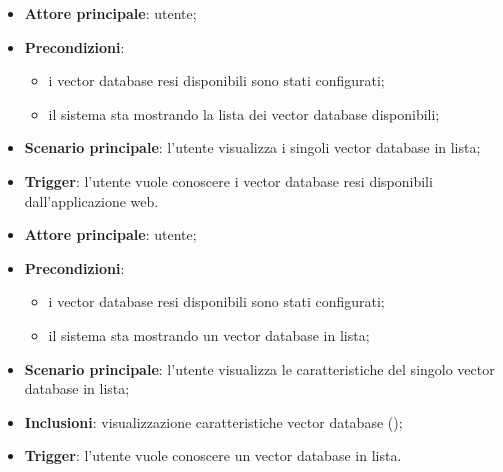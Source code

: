 \documentclass[10pt, a4paper]{article}
\begin{document}
    \begin{itemize}
        \item \textbf{Attore principale}: utente;
        \item \textbf{Precondizioni}: 
        \begin{itemize}
            \item i vector database resi disponibili sono stati configurati;
            \item il sistema sta mostrando la lista dei vector database disponibili;
        \end{itemize}
        \item \textbf{Scenario principale}: l’utente visualizza i singoli vector database in lista;
        \item \textbf{Trigger}: l’utente vuole conoscere i vector database resi disponibili dall’applicazione web.
    \end{itemize}
    
    \begin{itemize}
        \item \textbf{Attore principale}: utente;
        \item \textbf{Precondizioni}:
        \begin{itemize}
            \item i vector database resi disponibili sono stati configurati;
            \item il sistema sta mostrando un vector database in lista;
        \end{itemize} 
        \item \textbf{Scenario principale}: l'utente visualizza le caratteristiche del singolo vector database in lista;
        \item \textbf{Inclusioni}: visualizzazione caratteristiche vector database ();
        \item \textbf{Trigger}: l’utente vuole conoscere un vector database in lista.
    \end{itemize}
\end{document}
